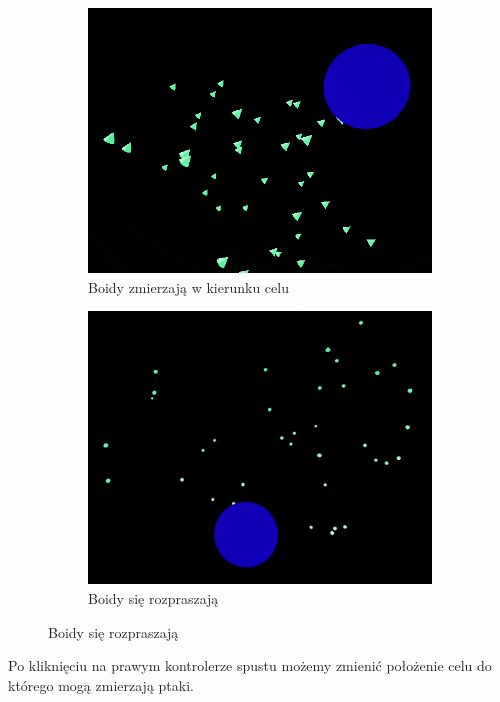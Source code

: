 \documentclass[a4paper,12pt,reqno]{article}
\begin{document}
\begin{figure}[H]%
	\centering
	\begin{subfigure}{.5\textwidth}
		\centering
		\includegraphics[width=0.8\linewidth]{graphics//boids/BoidsInUE_1.png}
		\caption{Boidy zmierzają w kierunku celu }	
		\label{ref:subref_a}
	\end{subfigure}%
	\begin{subfigure}{.5\textwidth}
		\centering
		\includegraphics[width=0.8\linewidth]{graphics//boids/BoidsInUE_2.png}
		\caption{Boidy się rozpraszają}
		\label{ref:subref_b}
	\end{subfigure}%
\label{ref:ref}
\end{figure}

Po kliknięciu na prawym kontrolerze spustu możemy zmienić położenie celu do którego mogą zmierzają ptaki.
\end{document}
